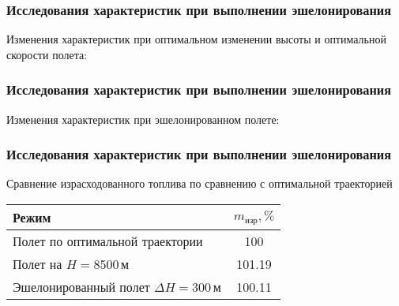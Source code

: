 \documentclass{beamer}
\begin{document}
\begin{frame}[t]
    \frametitle{Исследования характеристик при выполнении эшелонирования}
    \begin{center}
        Изменения характеристик при оптимальном изменении высоты и оптимальной
        скорости полета:

        \begin{minipage}{0.49\textwidth}
            \centering
            \resizebox{1.0\textwidth}{!}{}
        \end{minipage}
        \hfill
        \begin{minipage}{0.49\textwidth}
            \centering
            \resizebox{1.0\textwidth}{!}{}
        \end{minipage}
    \end{center}
\end{frame}

\begin{frame}[t]
    \frametitle{Исследования характеристик при выполнении эшелонирования}
    \begin{center}
        Изменения характеристик при эшелонированном полете: 

        \begin{minipage}{0.49\textwidth}
            \centering
            \resizebox{1.0\textwidth}{!}{}
        \end{minipage}
        \hfill
        \begin{minipage}{0.49\textwidth}
            \centering
            \resizebox{1.0\textwidth}{!}{
            }
        \end{minipage}
    \end{center}
\end{frame}


\begin{frame}[t]
    \frametitle{Исследования характеристик при выполнении эшелонирования}
    \begin{center}

        Сравнение израсходованного топлива по сравнению с
        оптимальной траекторией    

        \begin{tabular}{|p{}|c|}
            \hline
            Режим & $m_{изр}, \%$ \\ 
            \hline
            Полет по оптимальной траектории & 100 \\ 
            \hline
            Полет на $H=8500\,м$ & 101.19 \\
            \hline
            Эшелонированный полет $\Delta H =300\, м$ & 100.11 \\
            \hline
        \end{tabular}
    \end{center}
\end{frame}
\end{document}
